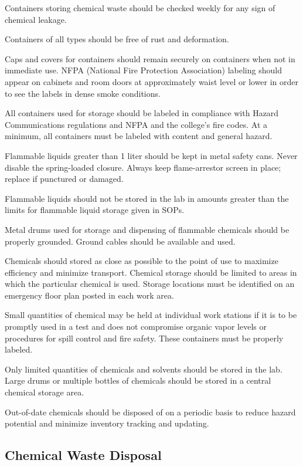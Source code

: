 \documentclass[12pt]{../SOP2}
\begin{document}
Containers storing chemical waste should be checked weekly for any sign of chemical leakage.

Containers of all types should be free of rust and deformation. 

Caps and covers for containers should remain securely on containers when not in immediate use.
NFPA (National Fire Protection Association) labeling should appear on cabinets and room doors at approximately waist level or lower in order to see the labels in dense smoke conditions.

All containers used for storage should be labeled in compliance with Hazard Communications regulations and NFPA and the college’s fire codes. At a minimum, all containers must be labeled with content and general hazard.

Flammable liquids greater than 1 liter should be kept in metal safety cans. Never disable the spring-loaded closure. Always keep flame-arrestor screen in place; replace if punctured or damaged. 

Flammable liquids should not be stored in the lab in amounts greater than the limits for flammable liquid storage given in SOPs. 

Metal drums used for storage and dispensing of flammable chemicals should be properly grounded. Ground cables should be available and used.

Chemicals should stored as close as possible to the point of use to maximize efficiency and minimize transport. Chemical storage should be limited to areas in which the particular chemical is used. Storage locations must be identified on an emergency floor plan posted in each work area.

Small quantities of chemical may be held at individual work stations if it is to be promptly used in a test and does not compromise organic vapor levels or procedures for spill control and fire safety. These containers must be properly labeled.

Only limited quantities of chemicals and solvents should be stored in the lab. Large drums or multiple bottles of chemicals should be stored in a central chemical storage area.

Out-of-date chemicals should be disposed of on a periodic basis to reduce hazard potential and minimize inventory tracking and updating.

\subsection{Chemical Waste Disposal}
\end{document}
